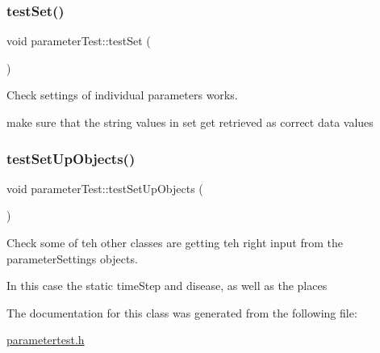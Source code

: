 \subsubsection{\texorpdfstring{test\+Set()}{testSet()}}
{\footnotesize\ttfamily void parameter\+Test\+::test\+Set (\begin{DoxyParamCaption}{ }\end{DoxyParamCaption})\hspace{0.3cm}{\ttfamily [inline]}}



Check settings of individual parameters works. 

make sure that the string values in set get retrieved as correct data values \mbox{\label{classparameterTest_aeb4d3a1620defdc974a9b925f4c1cd9f}} 
\subsubsection{\texorpdfstring{test\+Set\+Up\+Objects()}{testSetUpObjects()}}
{\footnotesize\ttfamily void parameter\+Test\+::test\+Set\+Up\+Objects (\begin{DoxyParamCaption}{ }\end{DoxyParamCaption})\hspace{0.3cm}{\ttfamily [inline]}}



Check some of teh other classes are getting teh right input from the parameter\+Settings objects. 

In this case the static time\+Step and disease, as well as the places 

The documentation for this class was generated from the following file\+:\begin{DoxyCompactItemize}
\item 
\mbox{\hyperlink{parametertest_8h}{parametertest.\+h}}\end{DoxyCompactItemize}
